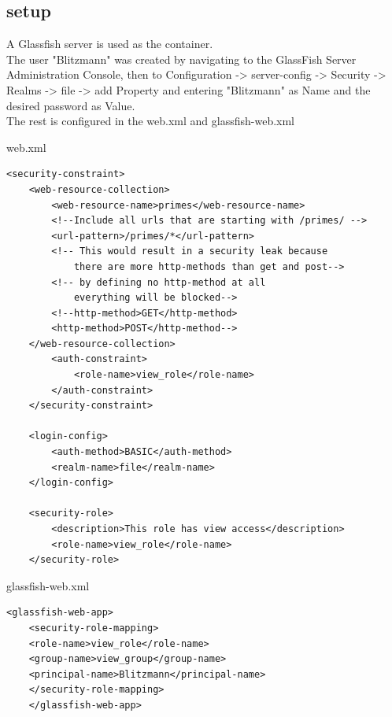 \documentclass[12pt,a4paper]{report}
\begin{document}
\subsection{setup}
A Glassfish server is used as the container.\\
The user "Blitzmann" was created by navigating to the GlassFish Server Administration Console, then to Configuration -> server-config -> Security -> Realms -> file -> add Property and entering "Blitzmann" as Name and the desired password as Value.\\
The rest is configured in the web.xml and glassfish-web.xml
\begin{bclogo}[couleur=yellow!15,arrondi=0.1,logo=\bccrayon, ombre = true]{web.xml}
	\begin{lstlisting}[style=XML]
    <security-constraint>
    <web-resource-collection>
	    <web-resource-name>primes</web-resource-name>
	    <!--Include all urls that are starting with /primes/ -->
	    <url-pattern>/primes/*</url-pattern>
	    <!-- This would result in a security leak because 
		    there are more http-methods than get and post-->
	    <!-- by defining no http-method at all 
		    everything will be blocked-->
	    <!--http-method>GET</http-method>
	    <http-method>POST</http-method-->
    </web-resource-collection>
	    <auth-constraint>
		    <role-name>view_role</role-name>
	    </auth-constraint>
    </security-constraint>
    
    <login-config>
	    <auth-method>BASIC</auth-method>
	    <realm-name>file</realm-name>
    </login-config>
    
    <security-role>
        <description>This role has view access</description>
        <role-name>view_role</role-name>
    </security-role>
	\end{lstlisting}
\end{bclogo}
\begin{bclogo}[couleur=yellow!15,arrondi=0.1,logo=\bccrayon, ombre = true]{glassfish-web.xml}
	\begin{lstlisting}[style=XML]
	<glassfish-web-app>
	<security-role-mapping>
	<role-name>view_role</role-name>
	<group-name>view_group</group-name>
	<principal-name>Blitzmann</principal-name>
	</security-role-mapping>
	</glassfish-web-app>
	\end{lstlisting}
\end{bclogo}
\end{document}

